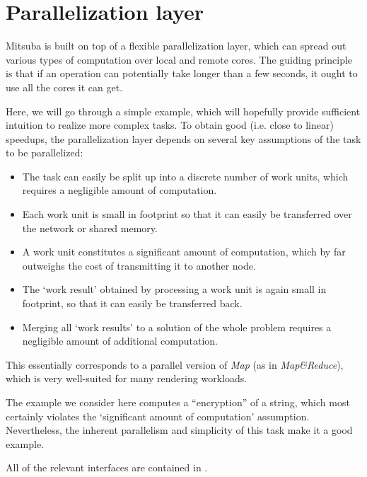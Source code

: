 \section{Parallelization layer}
Mitsuba is built on top of a flexible parallelization layer, which can spread out
various types of computation over local and remote cores.
The guiding principle is that if an operation can potentially take longer than a
few seconds, it ought to use all the cores it can get.

Here, we will go through a simple example, which will hopefully provide sufficient intuition
to realize more complex tasks. 
To obtain good (i.e. close to linear) speedups, the parallelization layer depends on
several key assumptions of the task to be parallelized:
\begin{itemize}
\item The task can easily be split up into a discrete number of work units, which requires a negligible amount of computation.
\item Each work unit is small in footprint so that it can easily be transferred over the network or shared memory. 
\item A work unit constitutes a significant amount of computation, which by far outweighs the cost of transmitting it to another node.
\item The `work result' obtained by processing a work unit is again small in footprint, so that it can easily be transferred back.
\item Merging all `work results' to a solution of the whole problem requires a negligible amount of additional computation.
\end{itemize}
This essentially corresponds to a parallel version of \emph{Map} (as in \emph{Map\&Reduce}), which is very
well-suited for many rendering workloads. 

The example we consider here computes a  ``encryption'' of a string, which 
most certainly violates the `significant amount of computation' assumption. Nevertheless, 
the inherent parallelism and simplicity of this task make it a good example.

All of the relevant interfaces are contained in .


